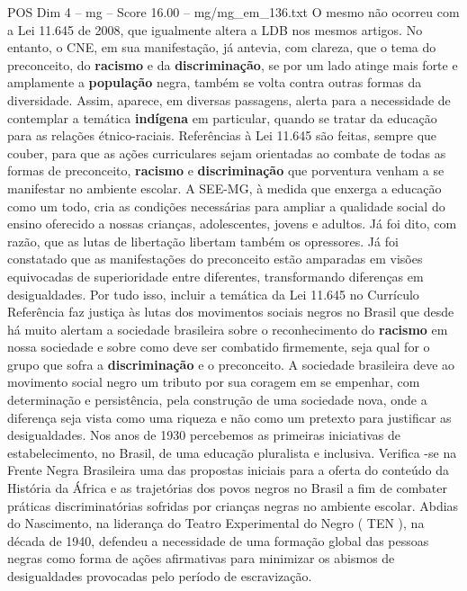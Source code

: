 \begin{textsample}{POS Dim 4 – mg – Score 16.00 – mg/mg\_em\_136.txt}  \label{ex:f4_pos_191}
O mesmo não ocorreu com a Lei 11.645 de 2008, que igualmente altera a LDB nos mesmos artigos.
No entanto, o CNE, em sua manifestação, já antevia, com clareza, que o tema do preconceito, do \textbf{racismo} e da \textbf{discriminação}, se por um lado atinge mais forte e amplamente a \textbf{população} negra, também se volta contra outras formas da diversidade.
Assim, aparece, em diversas passagens, alerta para a necessidade de contemplar a temática \textbf{indígena} em particular, quando se tratar da educação para as relações étnico-raciais.
Referências à Lei 11.645 são feitas, sempre que couber, para que as ações curriculares sejam orientadas ao combate de todas as formas de preconceito, \textbf{racismo} e \textbf{discriminação} que porventura venham a se manifestar no ambiente escolar.
A SEE-MG, à medida que enxerga a educação como um todo, cria as condições necessárias para ampliar a qualidade social do ensino oferecido a nossas crianças, adolescentes, jovens e adultos.
Já foi dito, com razão, que as lutas de libertação libertam também os opressores.
Já foi constatado que as manifestações do preconceito estão amparadas em visões equivocadas de superioridade entre diferentes, transformando diferenças em desigualdades.
Por tudo isso, incluir a temática da Lei 11.645 no Currículo Referência faz justiça às lutas dos movimentos sociais negros no Brasil que desde há muito alertam a sociedade brasileira sobre o reconhecimento do \textbf{racismo} em nossa sociedade e sobre como deve ser combatido firmemente, seja qual for o grupo que sofra a \textbf{discriminação} e o preconceito.
A sociedade brasileira deve ao movimento social negro um tributo por sua coragem em se empenhar, com determinação e persistência, pela construção de uma sociedade nova, onde a diferença seja vista como uma riqueza e não como um pretexto para justificar as desigualdades.
Nos anos de 1930 percebemos as primeiras iniciativas de estabelecimento, no Brasil, de uma educação pluralista e inclusiva.
Verifica -se na Frente Negra Brasileira uma das propostas iniciais para a oferta do conteúdo da História da África e as trajetórias dos povos negros no Brasil a fim de combater práticas discriminatórias sofridas por crianças negras no ambiente escolar.
Abdias do Nascimento, na liderança do Teatro Experimental do Negro ( TEN ), na década de 1940, defendeu a necessidade de uma formação global das pessoas negras como forma de ações afirmativas para minimizar os abismos de desigualdades provocadas pelo período de escravização.

\end{textsample}
